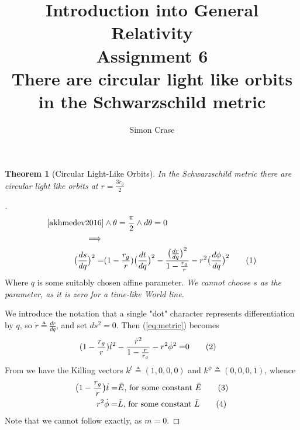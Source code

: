 \documentclass[]{article}
\title{Introduction into General Relativity\\Assignment 6\\There are circular light like orbits\\ in the Schwarzschild metric}
\author{Simon Crase}
\newtheorem{theorem}{Theorem}
\newcommand\numberthis{\addtocounter{equation}{1}\tag{\theequation}}
\begin{document}
\maketitle

\begin{theorem}[Circular Light-Like Orbits]
	In the Schwarzschild metric there are circular light like orbits at $r=\frac{3r_g}{2}$
\end{theorem}

\begin{proof}[]
	\begin{align*}
	\text{{\cite[Lecture VI,(128)]{akhmedev2016}}}  & \land \theta = \frac{\pi}{2} \land d\theta=0\\
	\implies &\\
	\big(\frac{ds}{dq}\big)^2 = & (1-\frac{r_g}{r})\big(\frac{dt}{dq}\big)^2 - \frac{\big(\frac{dr}{dq}\big)^2}{1-\frac{r_g}{r}}-r^2 \big(\frac{d\phi}{dq}\big)^2 \numberthis \label{eq:metric}
	\end{align*}
	Where $q$ is some suitably chosen affine parameter. \emph{We cannot choose $s$ as the parameter, as it is zero for a time-like World line.}
	
	We introduce the notation that a single "dot" character represents differentiation by $q$, so $\dot r \triangleq \frac{dr}{dq}$, and set $ds^2=0$. Then (\ref{eq:metric}) becomes
	\begin{align*}
		(1-\frac{r_g}{r})\dot t^2 - \frac{\dot r^2}{1-\frac{r}{r_g}}-r^2 \dot \phi^2 =& 0 \numberthis \label{eq:timelike}
	\end{align*}
	From \cite[Lecture VI]{akhmedev2016} we have the Killing vectors $k^t\triangleq(1,0,0,0)$ and $k^\phi\triangleq(0,0,0,1)$, whence
	\begin{align*}
	\big(1-\frac{r_g}{r}\big)\dot t =& \bar{E} \text{, for some constant $\bar{E}$} \numberthis \label{eq:noether1}\\
	r^2 \dot{\phi} =&\bar{L} \text{, for some constant $\bar{L}$} \numberthis \label{eq:noether2}
	\end{align*}
	Note that we cannot follow \cite[Lecture VI, (126) and (127)]{akhmedev2016} exactly, as $m=0$.
	

\end{proof}
\end{document}
